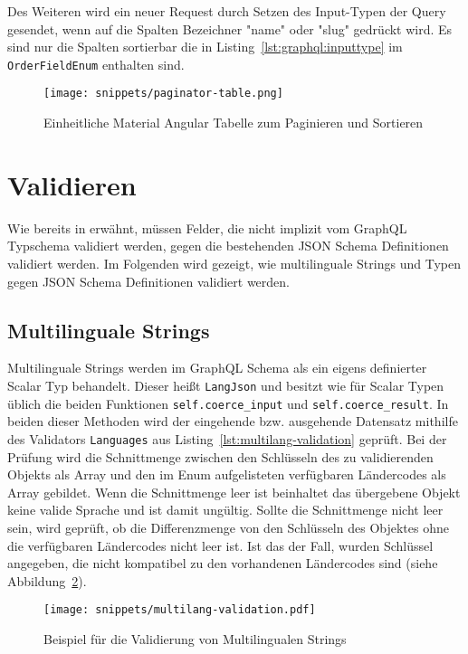 Des Weiteren wird ein neuer Request durch Setzen des Input-Typen der Query gesendet, wenn auf die Spalten Bezeichner "name" oder "slug" gedrückt wird. Es sind nur die Spalten sortierbar die in Listing~\ref{lst:graphql:inputtype} im \texttt{OrderFieldEnum} enthalten sind.

\begin{figure}[h!]
	\centering
	\texttt{[image: snippets/paginator-table.png]}
	\caption{Einheitliche Material Angular Tabelle zum Paginieren und Sortieren}
	\label{impl:graphql:paginator-table}
\end{figure}

\section{Validieren}
\label{graphql:validation}
Wie bereits in  erwähnt, müssen Felder, die nicht implizit vom GraphQL Typschema validiert werden, gegen die bestehenden JSON Schema Definitionen validiert werden. Im Folgenden wird gezeigt, wie multilinguale Strings und Typen gegen JSON Schema Definitionen validiert werden.

\subsection{Multilinguale Strings}
\label{graphql:validation:multi}
Multilinguale Strings werden im GraphQL Schema als ein eigens definierter Scalar Typ behandelt.
Dieser heißt \texttt{LangJson} und besitzt wie für Scalar Typen üblich die beiden Funktionen \texttt{self.coerce\_input} und \texttt{self.coerce\_result}. In beiden dieser Methoden wird der eingehende bzw. ausgehende Datensatz mithilfe des Validators \texttt{Languages} aus Listing~\ref{lst:multilang-validation} geprüft. 
Bei der Prüfung wird die Schnittmenge zwischen den Schlüsseln des zu validierenden Objekts als Array und den im Enum aufgelisteten verfügbaren Ländercodes als Array gebildet. Wenn die Schnittmenge leer ist beinhaltet das übergebene Objekt keine valide Sprache und ist damit ungültig. Sollte die Schnittmenge nicht leer sein, wird geprüft, ob die Differenzmenge von den Schlüsseln des Objektes ohne die verfügbaren Ländercodes nicht leer ist. Ist das der Fall, wurden Schlüssel angegeben, die nicht kompatibel zu den vorhandenen Ländercodes sind (siehe Abbildung~\ref{req:typesafe:example}). 

\begin{figure}[h!]
	\centering
	\texttt{[image: snippets/multilang-validation.pdf]}
	\caption{Beispiel für die Validierung von Multilingualen Strings}
	\label{req:typesafe:example}
\end{figure}


